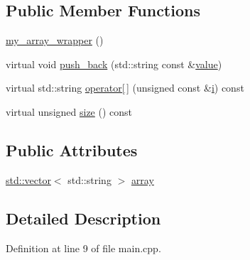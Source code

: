 \subsection*{Public Member Functions}
\begin{DoxyCompactItemize}
\item 
\hyperlink{structucif_1_1example_1_1my__array__wrapper_a0cf32def19204977e22f3d27efb95514}{my\-\_\-array\-\_\-wrapper} ()
\item 
virtual void \hyperlink{structucif_1_1example_1_1my__array__wrapper_a0062b807d864fe624b2cac1e82265789}{push\-\_\-back} (std\-::string const \&\hyperlink{read_config_file_8m_afcc7a4b78ecd8fa7e713f8cfa0f51017}{value})
\item 
virtual std\-::string \hyperlink{structucif_1_1example_1_1my__array__wrapper_af0d2306825fa26fa6c80b034bd1db494}{operator\mbox{[}$\,$\mbox{]}} (unsigned const \&\hyperlink{_read_d_m3___matlab_8m_a6f6ccfcf58b31cb6412107d9d5281426}{i}) const 
\item 
virtual unsigned \hyperlink{structucif_1_1example_1_1my__array__wrapper_a065656350c77567177dafa4816fcec77}{size} () const 
\end{DoxyCompactItemize}
\subsection*{Public Attributes}
\begin{DoxyCompactItemize}
\item 
\hyperlink{qmb_8m_af54b69a32590de218622e869b06b47b3}{std\-::vector}$<$ std\-::string $>$ \hyperlink{structucif_1_1example_1_1my__array__wrapper_aba0c527b2f8e3e2ccc7b6bb650e55563}{array}
\end{DoxyCompactItemize}


\subsection{Detailed Description}


Definition at line 9 of file main.\-cpp.



